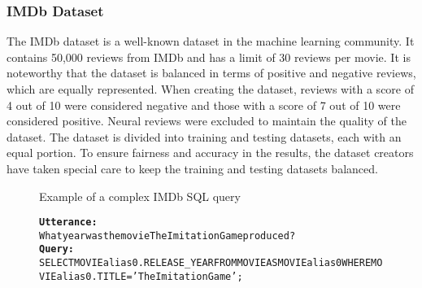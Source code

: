 \subsubsection{IMDb Dataset}

The IMDb dataset is a well-known dataset in the machine learning community. It contains 50,000 reviews from IMDb and has a limit of 30 reviews per movie\cite{maas-EtAl:2011:ACL-HLT2011}. It is noteworthy that the dataset is balanced in terms of positive and negative reviews, which are equally represented. When creating the dataset, reviews with a score of 4 out of 10 were considered negative and those with a score of 7 out of 10 were considered positive. Neural reviews were excluded to maintain the quality of the dataset. The dataset is divided into training and testing datasets, each with an equal portion. To ensure fairness and accuracy in the results, the dataset creators have taken special care to keep the training and testing datasets balanced.

\begin{figure}[H]
    \label{tab:IMDBsqlquery}
    \begin{AIbox}{Example of a complex IMDb SQL query}
        \vspace{-5px}
        \parbox{1\textwidth}{\scriptsize
        \begin{alltt} 
            {\bf Utterance:} \\ 
            What year was the movie The Imitation Game produced?
            \\
            {\bf Query:} \\
            SELECT MOVIEalias0.RELEASE\_YEAR FROM MOVIE AS MOVIEalias0 WHERE MOVIEalias0.TITLE = 'The Imitation Game' ;
        \end{alltt}
        }
        \vspace{-5px}
    \end{AIbox}
\end{figure}
